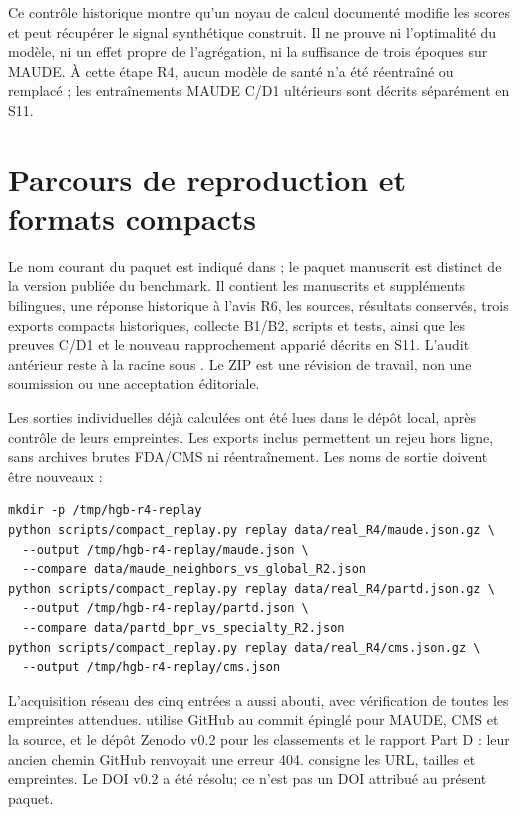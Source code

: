 Ce contrôle historique montre qu'un noyau de calcul documenté modifie les scores et peut récupérer le signal synthétique construit. Il ne prouve ni l'optimalité du modèle, ni un effet propre de l'agrégation, ni la suffisance de trois époques sur MAUDE. À cette étape R4, aucun modèle de santé n'a été réentraîné ou remplacé ; les entraînements MAUDE C/D1 ultérieurs sont décrits séparément en S11.

\par{}
\section{Parcours de reproduction et formats compacts}
\label{supp:replay}
Le nom courant du paquet est indiqué dans  ; le paquet manuscrit est distinct de la version publiée du benchmark. Il contient les manuscrits et suppléments bilingues, une réponse historique à l'avis R6, les sources, résultats conservés, trois exports compacts historiques, collecte B1/B2, scripts et tests, ainsi que les preuves C/D1 et le nouveau rapprochement apparié décrits en S11. L'audit antérieur reste à la racine sous . Le ZIP est une révision de travail, non une soumission ou une acceptation éditoriale.

Les sorties individuelles déjà calculées ont été lues dans le dépôt local, après contrôle de leurs empreintes. Les exports inclus permettent un rejeu hors ligne, sans archives brutes FDA/CMS ni réentraînement. Les noms de sortie doivent être nouveaux :

\begin{Verbatim}[fontsize=\footnotesize]
mkdir -p /tmp/hgb-r4-replay
python scripts/compact_replay.py replay data/real_R4/maude.json.gz \
  --output /tmp/hgb-r4-replay/maude.json \
  --compare data/maude_neighbors_vs_global_R2.json
python scripts/compact_replay.py replay data/real_R4/partd.json.gz \
  --output /tmp/hgb-r4-replay/partd.json \
  --compare data/partd_bpr_vs_specialty_R2.json
python scripts/compact_replay.py replay data/real_R4/cms.json.gz \
  --output /tmp/hgb-r4-replay/cms.json
\end{Verbatim}

L'acquisition réseau des cinq entrées a aussi abouti, avec vérification de toutes les empreintes attendues.  utilise GitHub au commit épinglé pour MAUDE, CMS et la source, et le dépôt Zenodo v0.2 pour les classements et le rapport Part D : leur ancien chemin GitHub renvoyait une erreur 404.  consigne les URL, tailles et empreintes. Le DOI v0.2 a été résolu; ce n'est pas un DOI attribué au présent paquet.

